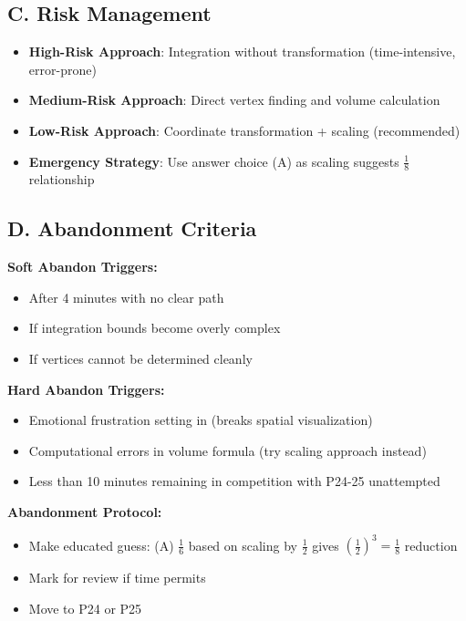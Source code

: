 \documentclass[11pt]{article}
\begin{document}
\begin{competitionbox}
\subsection*{C. Risk Management}
\begin{itemize}[leftmargin=*]
    \item \textbf{High-Risk Approach}: Integration without transformation (time-intensive, error-prone)
    \item \textbf{Medium-Risk Approach}: Direct vertex finding and volume calculation
    \item \textbf{Low-Risk Approach}: Coordinate transformation + scaling (recommended)
    \item \textbf{Emergency Strategy}: Use answer choice (A) as scaling suggests $\frac{1}{8}$ relationship
\end{itemize}

\subsection*{D. Abandonment Criteria}

\textbf{Soft Abandon Triggers:}
\begin{itemize}[leftmargin=*]
    \item After 4 minutes with no clear path
    \item If integration bounds become overly complex
    \item If vertices cannot be determined cleanly
\end{itemize}

\textbf{Hard Abandon Triggers:}
\begin{itemize}[leftmargin=*]
    \item Emotional frustration setting in (breaks spatial visualization)
    \item Computational errors in volume formula (try scaling approach instead)
    \item Less than 10 minutes remaining in competition with P24-25 unattempted
\end{itemize}

\textbf{Abandonment Protocol:}
\begin{itemize}[leftmargin=*]
    \item Make educated guess: (A) $\frac{1}{6}$ based on scaling by $\frac{1}{2}$ gives $(\frac{1}{2})^3 = \frac{1}{8}$ reduction
    \item Mark for review if time permits
    \item Move to P24 or P25
\end{itemize}


\end{competitionbox}
\end{document}
